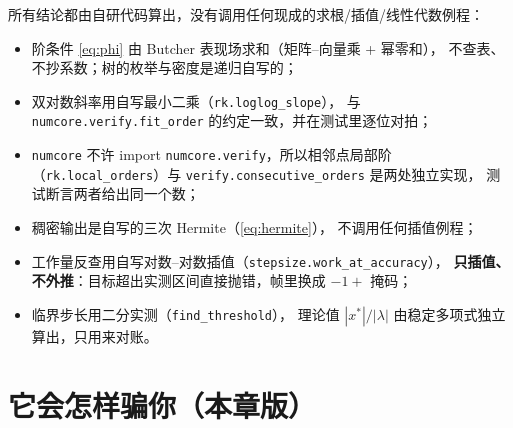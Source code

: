 所有结论都由自研代码算出，没有调用任何现成的求根/插值/线性代数例程：

\begin{itemize}
  \item 阶条件 \eqref{eq:phi} 由 Butcher 表现场求和（矩阵--向量乘 + 幂零和），
        不查表、不抄系数；树的枚举与密度是递归自写的；
  \item 双对数斜率用自写最小二乘（\texttt{rk.loglog\_slope}），
        与 \texttt{numcore.verify.fit\_order} 的约定一致，并在测试里逐位对拍；
  \item \texttt{numcore} 不许 import \texttt{numcore.verify}，所以相邻点局部阶
        （\texttt{rk.local\_orders}）与 \texttt{verify.consecutive\_orders} 是两处独立实现，
        测试断言两者给出同一个数；
  \item 稠密输出是自写的三次 Hermite（\eqref{eq:hermite}），
        不调用任何插值例程；
  \item 工作量反查用自写对数--对数插值（\texttt{stepsize.work\_at\_accuracy}），
        \textbf{只插值、不外推}：目标超出实测区间直接抛错，帧里换成 $-1+$ 掩码；
  \item 临界步长用二分实测（\texttt{find\_threshold}），
        理论值 $|x^\ast|/|\lambda|$ 由稳定多项式独立算出，只用来对账。
\end{itemize}



\section{它会怎样骗你（本章版）}

